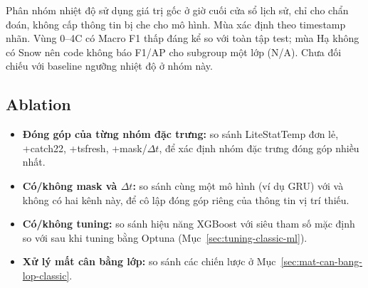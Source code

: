 Phân nhóm nhiệt độ sử dụng giá trị gốc ở giờ cuối cửa sổ lịch sử, chỉ cho chẩn đoán, không cấp thông tin bị che cho mô hình. Mùa xác định theo timestamp nhãn. Vùng 0--4\textdegree C có Macro F1 thấp đáng kể so với toàn tập test; mùa Hạ không có Snow nên code không báo F1/AP cho subgroup một lớp (N/A). Chưa đối chiếu với baseline ngưỡng nhiệt độ ở nhóm này.

\subsection{Ablation}
\label{sec:ablation}

\begin{itemize}
  \item \textbf{Đóng góp của từng nhóm đặc trưng:} so sánh LiteStatTemp đơn lẻ, +catch22,
        +tsfresh, +mask/$\Delta t$, để xác định nhóm đặc trưng đóng góp nhiều nhất.
  \item \textbf{Có/không mask và $\Delta t$:} so sánh cùng một mô hình (ví dụ GRU) với và
        không có hai kênh này, để cô lập đóng góp riêng của thông tin vị trí thiếu.
  \item \textbf{Có/không tuning:} so sánh hiệu năng XGBoost với siêu tham số mặc định so
        với sau khi tuning bằng Optuna (Mục~\ref{sec:tuning-classic-ml}).
  \item \textbf{Xử lý mất cân bằng lớp:} so sánh các chiến lược ở Mục~\ref{sec:mat-can-bang-lop-classic}.
\end{itemize}


